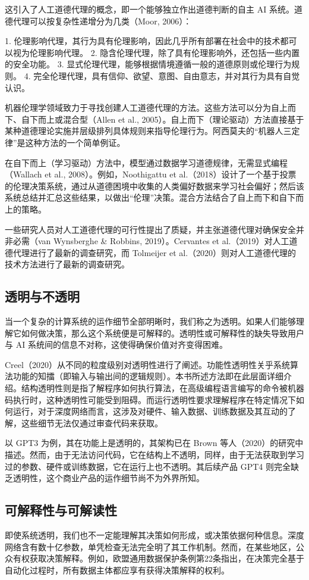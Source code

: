 这引入了人工道德代理的概念，即一个能够独立作出道德判断的自主 AI 系统。道德代理可以按复杂性递增分为几类（Moor, 2006）：

1. 伦理影响代理，其行为具有伦理影响，因此几乎所有部署在社会中的技术都可以视为伦理影响代理。
2. 隐含伦理代理，除了具有伦理影响外，还包括一些内置的安全功能。
3. 显式伦理代理，能够根据情境遵循一般的道德原则或伦理行为规则。
4. 完全伦理代理，具有信仰、欲望、意图、自由意志，并对其行为具有自觉认识。

机器伦理学领域致力于寻找创建人工道德代理的方法。这些方法可以分为自上而下、自下而上或混合型（Allen et al., 2005）。自上而下（理论驱动）方法直接基于某种道德理论实施并层级排列具体规则来指导伦理行为。阿西莫夫的“机器人三定律”是这种方法的一个简单例证。

在自下而上（学习驱动）方法中，模型通过数据学习道德规律，无需显式编程（Wallach et al., 2008）。例如，Noothigattu et al.（2018）设计了一个基于投票的伦理决策系统，通过从道德困境中收集的人类偏好数据来学习社会偏好；然后该系统总结并汇总这些结果，以做出“伦理”决策。混合方法结合了自上而下和自下而上的策略。

一些研究人员对人工道德代理的可行性提出了质疑，并主张道德代理对确保安全并非必需（van Wynsberghe \& Robbins, 2019）。Cervantes et al.（2019）对人工道德代理进行了最新的调查研究，而 Tolmeijer et al.（2020）则对人工道德代理的技术方法进行了最新的调查研究。

\subsection{透明与不透明}
当一个复杂的计算系统的运作细节全部明晰时，我们称之为透明。如果人们能够理解它如何做决策，那么这个系统便是可解释的。透明性或可解释性的缺失导致用户与 AI 系统间的信息不对称，这使得确保价值对齐变得困难。

Creel（2020）从不同的粒度级别对透明性进行了阐述。功能性透明性关乎系统算法功能的知擂（即输入与输出间的逻辑规则）。本书所述方法即在此层面详细介绍。结构透明性则是指了解程序如何执行算法，在高级编程语言编写的命令被机器码执行时，这种透明性可能受到阻碍。而运行透明性要求理解程序在特定情况下如何运行，对于深度网络而言，这涉及对硬件、输入数据、训练数据及其互动的了解，这些细节无法仅通过审查代码来获取。

以 GPT3 为例，其在功能上是透明的，其架构已在 Brown 等人（2020）的研究中描述。然而，由于无法访问代码，它在结构上不透明，同样，由于无法获取到学习过的参数、硬件或训练数据，它在运行上也不透明。其后续产品 GPT4 则完全缺乏透明性，这个商业产品的运作细节尚不为外界所知。

\subsection{可解释性与可解读性}
即使系统透明，我们也不一定能理解其决策如何形成，或决策依据何种信息。深度网络含有数十亿参数，单凭检查无法完全明了其工作机制。然而，在某些地区，公众有权获取决策解释。例如，欧盟通用数据保护条例第22条指出，在决策完全基于自动化过程时，所有数据主体都应享有获得决策解释的权利。

